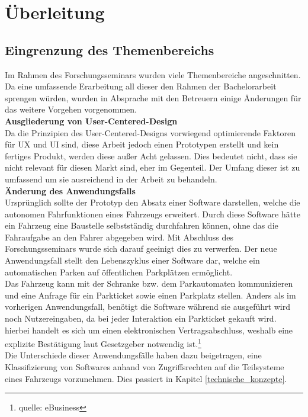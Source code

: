 \section{Überleitung}
\subsection{Eingrenzung des Themenbereichs}
Im Rahmen des Forschungsseminars wurden viele Themenbereiche angeschnitten. Da eine umfassende Erarbeitung all dieser den Rahmen der Bachelorarbeit sprengen würden, wurden in Absprache mit den Betreuern einige Änderungen für das weitere Vorgehen vorgenommen.\\

\textbf{Ausgliederung von User-Centered-Design}\\
Da die Prinzipien des User-Centered-Designs vorwiegend optimierende Faktoren für UX und UI sind, diese Arbeit jedoch einen Prototypen erstellt und kein fertiges Produkt, werden diese außer Acht gelassen. Dies bedeutet nicht, dass sie nicht relevant für diesen Markt sind, eher im Gegenteil. Der Umfang dieser ist zu umfassend um sie ausreichend in der Arbeit zu behandeln.\\

\textbf{Änderung des Anwendungsfalls}\\
Ursprünglich sollte der Prototyp den Absatz einer Software darstellen, welche die autonomen Fahrfunktionen eines Fahrzeugs erweitert. Durch diese Software hätte ein Fahrzeug eine Baustelle selbstständig durchfahren können, ohne das die Fahraufgabe an den Fahrer abgegeben wird. Mit Abschluss des Forschungsseminars wurde sich darauf geeinigt dies zu verwerfen. Der neue Anwendungsfall stellt den Lebenszyklus einer Software dar, welche ein automatischen Parken auf öffentlichen Parkplätzen ermöglicht.\\
Das Fahrzeug kann mit der Schranke bzw. dem Parkautomaten kommunizieren und eine Anfrage für ein Parkticket sowie einen Parkplatz stellen. Anders als im vorherigen Anwendungsfall, benötigt die Software während sie ausgeführt wird noch Nutzereingaben, da bei jeder Interaktion ein Parkticket gekauft wird. hierbei handelt es sich um einen elektronischen Vertragsabschluss, weshalb eine explizite Bestätigung laut Gesetzgeber notwendig ist.\footnote{quelle: eBusiness}\\
Die Unterschiede dieser Anwendungsfälle haben dazu beigetragen, eine Klassifizierung von Softwares anhand von Zugriffsrechten auf die Teilsysteme eines Fahrzeugs vorzunehmen. Dies passiert in Kapitel \ref{technische_konzepte}.\\

